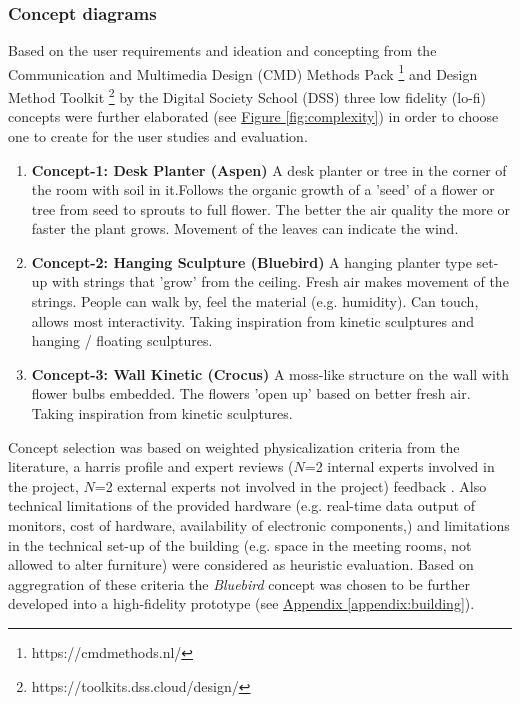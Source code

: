 \subsubsection{Concept diagrams}

Based on the user requirements and ideation and concepting from the Communication and Multimedia Design (CMD) Methods Pack \footnote{https://cmdmethods.nl/} and Design Method Toolkit \footnote{https://toolkits.dss.cloud/design/} by the Digital Society School (DSS) three low fidelity (lo-fi) concepts were further elaborated (see \hyperref[fig:complexity]{Figure \ref*{fig:complexity}}) in order to choose one to create for the user studies and evaluation. 


\begin{enumerate}
  \item \textbf{Concept-1: Desk Planter (Aspen)}
      A desk planter or tree in the corner of the room with soil in it.Follows the organic growth of a 'seed' of a flower or tree from seed to sprouts to full flower. The better the air quality the more or faster the plant grows. Movement of the leaves can indicate the wind.

  \item \textbf{Concept-2: Hanging Sculpture (Bluebird)}
      A hanging planter type set-up with strings that 'grow' from the ceiling. Fresh air makes movement of the strings. People can walk by, feel the material (e.g. humidity). Can touch, allows most interactivity. Taking inspiration from kinetic sculptures and hanging / floating sculptures.

  \item \textbf{Concept-3: Wall Kinetic (Crocus)}
      A moss-like structure on the wall with flower bulbs embedded. The flowers 'open up' based on better fresh air. Taking inspiration from kinetic sculptures.
\end{enumerate}


Concept selection was based on weighted physicalization criteria from the literature, a harris profile and expert reviews ($N$=2 internal experts involved in the project, $N$=2 external experts not involved in the project) feedback . Also technical limitations of the provided hardware (e.g. real-time data output of monitors, cost of hardware, availability of electronic components,) and limitations in the technical set-up of the building (e.g. space in the meeting rooms, not allowed to alter furniture) were considered as heuristic evaluation. Based on aggregration of these criteria the \textit{Bluebird} concept was chosen to be further developed into a high-fidelity prototype (see \hyperref[appendix:building]{Appendix \ref*{appendix:building}}).


